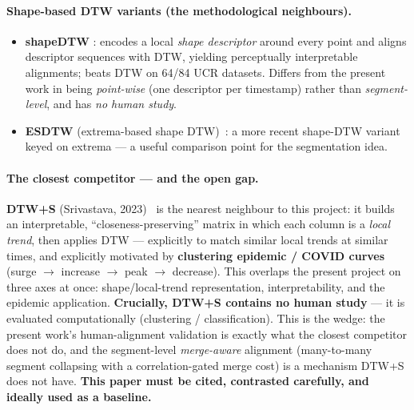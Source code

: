 \documentclass[11pt]{article}
\begin{document}
\paragraph{Shape-based DTW variants (the methodological neighbours).}
\begin{itemize}[leftmargin=*]
  \item \textbf{shapeDTW} \cite{zhao2018}: encodes a local \emph{shape descriptor} around
  every point and aligns descriptor sequences with DTW, yielding perceptually
  interpretable alignments; beats DTW on 64/84 UCR datasets. Differs from the present work
  in being \emph{point-wise} (one descriptor per timestamp) rather than
  \emph{segment-level}, and has \emph{no human study}.
  \item \textbf{ESDTW} (extrema-based shape DTW)~\cite{esdtw2023}: a more recent shape-DTW
  variant keyed on extrema --- a useful comparison point for the segmentation idea.
\end{itemize}

\paragraph{The closest competitor --- and the open gap.}
\textbf{DTW+S} (Srivastava, 2023)~\cite{dtwpluss} is the nearest neighbour to this project:
it builds an interpretable, ``closeness-preserving'' matrix in which each column is a
\emph{local trend}, then applies DTW --- explicitly to match similar local trends at
similar times, and explicitly motivated by \textbf{clustering epidemic / COVID curves}
(surge $\to$ increase $\to$ peak $\to$ decrease). This overlaps the present project on
three axes at once: shape/local-trend representation, interpretability, and the epidemic
application. \textbf{Crucially, DTW+S contains no human study} --- it is evaluated
computationally (clustering / classification). This is the wedge: the present work's
human-alignment validation is exactly what the closest competitor does not do, and the
segment-level \emph{merge-aware} alignment (many-to-many segment collapsing with a
correlation-gated merge cost) is a mechanism DTW+S does not have. \textbf{This paper must
be cited, contrasted carefully, and ideally used as a baseline.}
\end{document}

